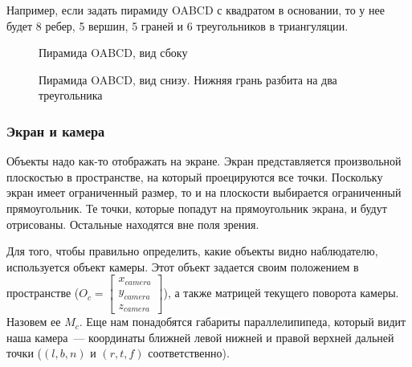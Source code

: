 \documentclass{article}
\begin{document}
Например, если задать пирамиду OABCD с квадратом в основании, то у нее будет 8 ребер, 5 вершин, 5 граней и 6 треугольников в триангуляции.

\begin{center}
\begin{figure}[h]
\caption{Пирамида OABCD, вид сбоку}
\label{ris:image}
\end{figure}
\begin{figure}[h]
\caption{Пирамида OABCD, вид снизу. Нижняя грань разбита на два треугольника}
\label{ris:image}
\end{figure}
\end{center}

\subsubsection{Экран и камера}

Объекты надо как-то отображать на экране. Экран представляется произвольной плоскостью в пространстве, на который проецируются все точки. Поскольку экран имеет ограниченный размер, то и на плоскости выбирается ограниченный прямоугольник. Те точки, которые попадут на прямоугольник экрана, и будут отрисованы. Остальные находятся вне поля зрения.

Для того, чтобы правильно определить, какие объекты видно наблюдателю, используется объект камеры. Этот объект задается своим положением в пространстве ($O_c =  \begin{bmatrix} x_{camera} \\ y_{camera} \\ z_{camera} \end{bmatrix}$), а также матрицей текущего поворота камеры. Назовем ее $M_c$. Еще нам понадобятся габариты параллелипипеда, который видит наша камера~--- координаты ближней левой нижней и правой верхней дальней точки ($(l, b, n)$ и $(r, t, f)$ соответственно).
\end{document}
